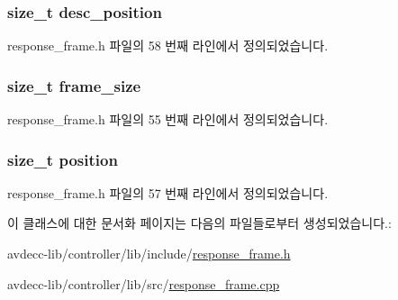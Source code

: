 \subsubsection[{\texorpdfstring{desc\+\_\+position}{desc_position}}]{\setlength{\rightskip}{0pt plus 5cm}size\+\_\+t desc\+\_\+position}\hypertarget{classavdecc__lib_1_1response__frame_a9b198f596b07f24187c48418a35e07aa}{}\label{classavdecc__lib_1_1response__frame_a9b198f596b07f24187c48418a35e07aa}


response\+\_\+frame.\+h 파일의 58 번째 라인에서 정의되었습니다.

\subsubsection[{\texorpdfstring{frame\+\_\+size}{frame_size}}]{\setlength{\rightskip}{0pt plus 5cm}size\+\_\+t frame\+\_\+size}\hypertarget{classavdecc__lib_1_1response__frame_affd041a595cabab98275245b9cb2824d}{}\label{classavdecc__lib_1_1response__frame_affd041a595cabab98275245b9cb2824d}


response\+\_\+frame.\+h 파일의 55 번째 라인에서 정의되었습니다.

\subsubsection[{\texorpdfstring{position}{position}}]{\setlength{\rightskip}{0pt plus 5cm}size\+\_\+t position}\hypertarget{classavdecc__lib_1_1response__frame_a7a04afe5347934be732ec70a70bd0a28}{}\label{classavdecc__lib_1_1response__frame_a7a04afe5347934be732ec70a70bd0a28}


response\+\_\+frame.\+h 파일의 57 번째 라인에서 정의되었습니다.



이 클래스에 대한 문서화 페이지는 다음의 파일들로부터 생성되었습니다.\+:\begin{DoxyCompactItemize}
\item 
avdecc-\/lib/controller/lib/include/\hyperlink{response__frame_8h}{response\+\_\+frame.\+h}\item 
avdecc-\/lib/controller/lib/src/\hyperlink{response__frame_8cpp}{response\+\_\+frame.\+cpp}\end{DoxyCompactItemize}
